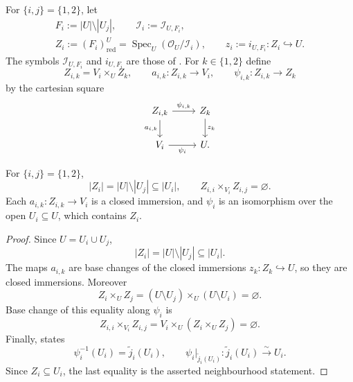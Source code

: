 \begin{definition}
  \label{def:nagata-two-open-boundary-loci}

  For $\{i,j\}=\{1,2\}$, let
  \[
  \begin{gathered}
    F_i:=|U|\setminus|U_j|,\qquad
    \mathcal I_i:=\mathcal I_{U,F_i},\\
    Z_i:=(F_i)_{\mathrm{red}}^U
      =\operatorname{Spec}_U(\mathcal O_U/\mathcal I_i),
    \qquad
    z_i:=i_{U,F_i}\colon Z_i\hookrightarrow U.
  \end{gathered}
  \]
  The symbols $\mathcal I_{U,F_i}$ and $i_{U,F_i}$ are those of
  .  For $k\in\{1,2\}$ define
  \[
    Z_{i,k}=V_i\times_UZ_k,\qquad
    a_{i,k}\colon Z_{i,k}\to V_i,\qquad
    \psi_{i,k}\colon Z_{i,k}\to Z_k
  \]
  by the cartesian square
  \[
    \begin{tikzcd}
      Z_{i,k} \arrow[r,"\psi_{i,k}"] \arrow[d,"a_{i,k}"']
        & Z_k \arrow[d,"z_k"]\\
      V_i \arrow[r,"\psi_i"'] & U.
    \end{tikzcd}
  \]
\end{definition}

\begin{lemma}
  \label{lemma:nagata-boundary-loci}

  For $\{i,j\}=\{1,2\}$,
  \[
    |Z_i|=|U|\setminus|U_j|\subseteq|U_i|,
    \qquad
    Z_{i,i}\times_{V_i}Z_{i,j}=\varnothing.
  \]
  Each $a_{i,k}\colon Z_{i,k}\to V_i$ is a closed immersion, and
  $\psi_i$ is an isomorphism over the open $U_i\subseteq U$, which contains
  $Z_i$.
\end{lemma}

\begin{proof}
  Since $U=U_i\cup U_j$,
  \[
    |Z_i|=|U|\setminus|U_j|
      \subseteq |U_i|.
  \]
  The maps $a_{i,k}$ are base changes of the closed immersions
  $z_k\colon Z_k\hookrightarrow U$, so they are closed immersions.  Moreover
  \[
    Z_i\times_UZ_j
      =(U\setminus U_j)\times_U(U\setminus U_i)
      =\varnothing.
  \]
  Base change of this equality along $\psi_i$ is
  \[
    Z_{i,i}\times_{V_i}Z_{i,j}
      =V_i\times_U(Z_i\times_UZ_j)=\varnothing.
  \]
  Finally,  states
  \[
    \psi_i^{-1}(U_i)=\widetilde j_i(U_i),\qquad
    \psi_i|_{\widetilde j_i(U_i)}\colon
      \widetilde j_i(U_i)\xrightarrow{\sim}U_i.
  \]
  Since $Z_i\subseteq U_i$, the last equality is the asserted
  neighbourhood statement.
\end{proof}

